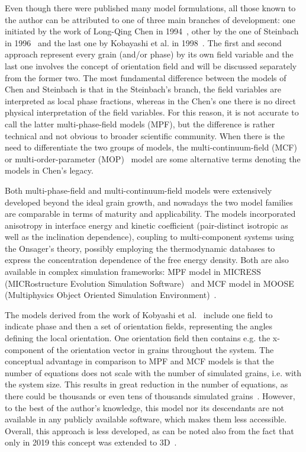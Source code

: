 	Even though there were published many model formulations, all those known to the author can be attributed to one of three main branches of development: one initiated by the work of Long-Qing Chen in 1994~\cite{Chen1994}, other by the one of Steinbach in 1996~\cite{Steinbach1996} and the last one by Kobayashi et al. in 1998~\cite{Kobayashi1998}. The first and second approach represent every grain (and/or phase) by its own field variable and the last one involves the concept of orientation field and will be discussed separately from the former two. The most fundamental difference between the models of Chen and Steinbach is that in the Steinbach's branch, the field variables are interpreted as local phase fractions, whereas in the Chen's one there is no direct physical interpretation of the field variables. For this reason, it is not accurate to call the latter multi-phase-field models (MPF), but the difference is rather technical and not obvious to broader scientific community. When there is the need to differentiate the two groups of models, the multi-continuum-field (MCF)~\cite{Moelans2009} or multi-order-parameter (MOP)~\cite{Toth2015,Daubner2023} model are some alternative terms denoting the models in Chen's legacy.
	
	Both multi-phase-field and multi-continuum-field models were extensively developed beyond the ideal grain growth, and nowadays the two model families are comparable in terms of maturity and applicability. The models incorporated anisotropy in interface energy and kinetic coefficient (pair-distinct isotropic as well as the inclination dependence), coupling to multi-component systems using the Onsager's theory, possibly employing the thermodynamic databases to express the concentration dependence of the free energy density. Both are also available in complex simulation frameworks: MPF model in MICRESS (MICRostructure Evolution Simulation Software)~\cite{Eiken2006} and MCF model in MOOSE (Multiphysics Object Oriented Simulation Environment)~\cite{Permann2020}.
	
	The models derived from the work of Kobyashi et al.~\cite{Kobayashi1998} include one field to indicate phase and then a set of orientation fields, representing the angles defining the local orientation. One orientation field then contains e.g. the x-component of the orientation vector in grains throughout the system. The conceptual advantage in comparison to MPF and MCF models is that the number of equations does not scale with the number of simulated grains, i.e. with the system size. This results in great reduction in the number of equations, as there could be thousands or even tens of thousands simulated grains~\cite{Yadav2016}. However, to the best of the author's knowledge, this model nor its descendants are not available in any publicly available software, which makes them less accessible. Overall, this approach is less developed, as can be noted also from the fact that only in 2019 this concept was extended to 3D~\cite{Sadamoto2019}. 
	
